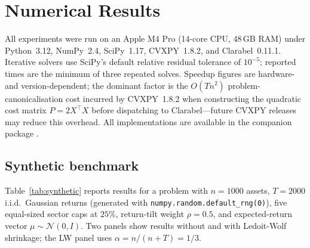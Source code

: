 \documentclass{siam/siamart}
\begin{document}
\section{Numerical Results}\label{sec:results}

All experiments were run on an Apple M4 Pro (14-core CPU, 48\,GB RAM) under
Python~3.12, NumPy~2.4, SciPy~1.17, CVXPY~1.8.2, and Clarabel~0.11.1.
Iterative solvers use SciPy's default relative residual tolerance of $10^{-5}$;
reported times are the minimum of three repeated solves.  Speedup figures are
hardware- and version-dependent; the dominant factor is the $O(Tn^2)$
problem-canonicalisation cost incurred by CVXPY~1.8.2 when constructing the
quadratic cost matrix $P = 2X^\top X$ before dispatching to Clarabel---future
CVXPY releases may reduce this overhead.  All implementations are available in
the companion package \cite{fast_minimum_variance}.

\subsection{Synthetic benchmark}\label{sec:synth}

Table~\ref{tab:synthetic} reports results for a problem with $n=1000$ assets,
$T=2000$ i.i.d.\ Gaussian returns (generated with \texttt{numpy.random.default\_rng(0)}),
five equal-sized sector caps at $25\%$, return-tilt weight $\rho=0.5$, and
expected-return vector $\mu\sim\mathcal{N}(0,I)$.  Two panels show results without
and with Ledoit-Wolf shrinkage; the LW panel uses $\alpha = n/(n+T) = 1/3$.
\end{document}
